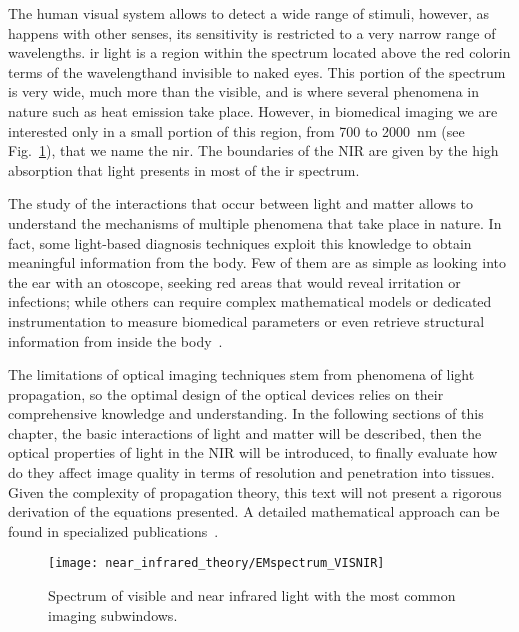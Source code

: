 The human visual system allows to detect a wide range of stimuli, however, as happens with other senses, its sensitivity is restricted to a very narrow range of wavelengths. \gls{ir} light is a region within the spectrum located above the red color\textemdash in terms of the wavelength\textemdash and invisible to naked eyes. This portion of the spectrum is very wide, much more than the visible, and is where several phenomena in nature such as heat emission take place. However, in biomedical imaging we are interested only in a small portion of this region, from 700 to \SI{2000}{\nm} (see Fig.~\ref{fig:theory_em_spectrum}), that we name the \gls{nir}. The boundaries of the NIR are given by the high absorption that light presents in most of the \gls{ir} spectrum. 

The study of the interactions that occur between light and matter allows to understand the mechanisms of multiple phenomena that take place in nature. In fact, some light-based diagnosis techniques exploit this knowledge to obtain meaningful information from the body. Few of them are as simple as looking into the ear with an otoscope, seeking red areas that would reveal irritation or infections; while others can require complex mathematical models or dedicated instrumentation to measure biomedical parameters or even retrieve structural information from inside the body~\cite{Ntziachristos2002}.

The limitations of optical imaging techniques stem from phenomena of light propagation, so the optimal design of the optical devices relies on their comprehensive knowledge and understanding. In the following sections of this chapter, the basic interactions of light and matter will be described, then the optical properties of light in the NIR will be introduced, to finally evaluate how do they affect image quality in terms of resolution and penetration into tissues. Given the complexity of propagation theory, this text will not present a rigorous derivation of the equations presented. A detailed mathematical approach can be found in specialized publications~\cite{Ishimaru1978,Lorenzo2012,Born1999}.

\begin{figure}[]
\centering
\texttt{[image: near\_infrared\_theory/EMspectrum\_VISNIR]}
%
%
\caption{Spectrum of visible and near infrared light with the most common imaging subwindows.}
\label{fig:theory_em_spectrum}       %
\end{figure}

